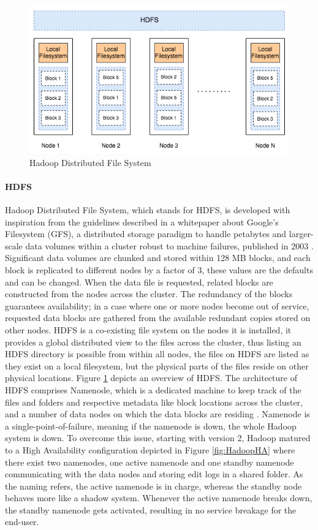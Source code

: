 \documentclass[review]{elsarticle}
\begin{document}
\begin{figure}[h!]
	\caption{Hadoop Distributed File System}
	\label{fig:HDFSoverview}
	\includegraphics[width=\textwidth]{HDFSoverview}
	\centering
\end{figure}

\paragraph{HDFS}Hadoop Distributed File System, which stands for HDFS, is developed with inspiration from the guidelines described in a whitepaper about Google's Filesystem (GFS), a distributed storage paradigm to handle petabytes and larger-scale data volumes within a cluster robust to machine failures, published in 2003 \cite{ghemawat_google_2003}. Significant data volumes are chunked and stored within 128 MB blocks, and each block is replicated to different nodes by a factor of 3, these values are the defaults and can be changed. When the data file is requested, related blocks are constructed from the nodes across the cluster. The redundancy of the blocks guarantees availability; in a case where one or more nodes become out of service, requested data blocks are gathered from the available redundant copies stored on other nodes. HDFS is a co-existing file system on the nodes it is installed, it provides a global distributed view to the files across the cluster, thus listing an HDFS directory is possible from within all nodes, the files on HDFS are listed as they exist on a local filesystem, but the physical parts of the files reside on other physical locations. Figure \ref{fig:HDFSoverview} depicts an overview of HDFS. The architecture of HDFS comprises Namenode, which is a dedicated machine to keep track of the files and folders and respective metadata like block locations across the cluster, and a number of data nodes on which the data blocks are residing \cite{white_hadoop_2015}. Namenode is a single-point-of-failure, meaning if the namenode is down, the whole Hadoop system is down. To overcome this issue, starting with version 2, Hadoop matured to a High Availability configuration depicted in Figure \ref{fig:HadoopHA} where there exist two namenodes, one active namenode and one standby namenode communicating with the data nodes and storing edit logs in a shared folder. As the naming refers, the active namenode is in charge, whereas the standby node behaves more like a shadow system. Whenever the active namenode breaks down, the standby namenode gets activated, resulting in no service breakage for the end-user.
\end{document}
